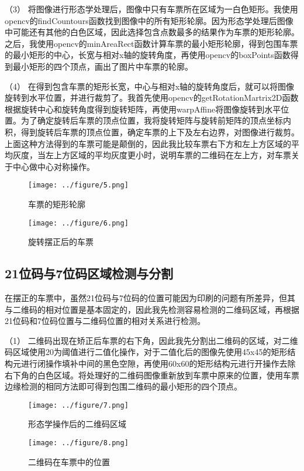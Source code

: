 \documentclass[11pt]{ctexart}
\begin{document}
	（3） 将图像进行形态学处理后，图像中只有车票所在区域为一白色矩形。我使用opencv的findCountours函数找到图像中的所有矩形轮廓。因为形态学处理后图像中可能还有其他的白色区域，因此选择包含点数最多的结果作为车票的矩形轮廓。之后，我使用opencv的minAreaRect函数计算车票的最小矩形轮廓，得到包围车票的最小矩形的中心，长宽与相对x轴的旋转角度，再使用opencv的boxPoints函数得到最小矩形的四个顶点，画出了图片中车票的轮廓。
	
	（4） 在得到包含车票的矩形长宽，中心与相对x轴的旋转角度后，就可以将图像旋转到水平位置，并进行裁剪了。我首先使用opencv的getRotationMartrix2D函数根据旋转中心和旋转角度得到旋转矩阵，再使用warpAffine将图像旋转到水平位置。为了确定旋转后车票的顶点位置，我将旋转矩阵与旋转前矩阵的顶点坐标内积，得到旋转后车票的顶点位置，确定车票的上下及左右边界，对图像进行裁剪。上面这种方法得到的车票可能是颠倒的，因此我比较车票右下方和左上方区域的平均灰度，当左上方区域的平均灰度更小时，说明车票的二维码在左上方，对车票关于中心做中心对称操作。
	
	\begin{figure}[h]
		\begin{minipage}[H]{0.5\linewidth}
			\centering
			\texttt{[image: ../figure/5.png]}
			\caption{车票的矩形轮廓}
		\end{minipage}%
		\begin{minipage}[H]{0.5\linewidth}
			\centering
			\texttt{[image: ../figure/6.png]}
			\caption{旋转摆正后的车票}
		\end{minipage}
	\end{figure}
	
	
	\subsection{21位码与7位码区域检测与分割}
	在摆正的车票中，虽然21位码与7位码的位置可能因为印刷的问题有所差异，但其与二维码的相对位置是基本固定的，因此我先检测容易检测的二维码区域，再根据21位码和7位码位置与二维码位置的相对关系进行检测。
	
	（1） 二维码出现在矫正后车票的右下角，因此我先分割出二维码的区域，对二维码区域使用20为阈值进行二值化操作，对于二值化后的图像先使用45x45的矩形结构元进行闭操作填补中间的黑色空隙，再使用60x60的矩形结构元进行开操作去除右下角的白色区域。将处理好的二维码图像重新放到车票中原来的位置，使用车票边缘检测的相同方法即可得到包围二维码的最小矩形的四个顶点。
	
	\begin{figure}[h]
		\begin{minipage}[H]{0.5\linewidth}
			\centering
			\texttt{[image: ../figure/7.png]}
			\caption{形态学操作后的二维码区域}
		\end{minipage}%
		\begin{minipage}[H]{0.5\linewidth}
			\centering
			\texttt{[image: ../figure/8.png]}
			\caption{二维码在车票中的位置}
		\end{minipage}
	\end{figure}
	
\end{document}
